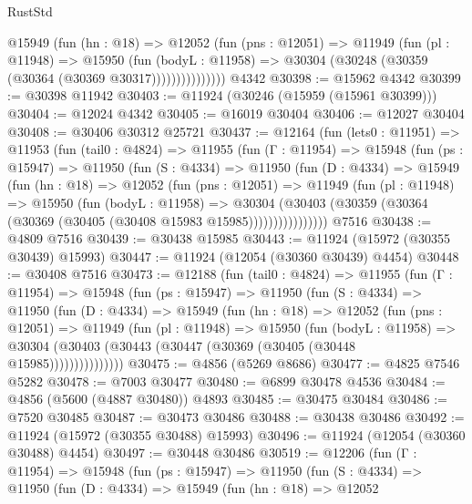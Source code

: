 \begin{lexlean}{RustStd}
\begin{coremodule}
{\begin{coremodule}
{{{{{{{{{{{{{{{{{{{{{{{{{{{{{{{{{{{{{{{{{{{{{{{{{{{{{{{{{{{{{{{{{{{{{{{{{{{{{{{{                @15949
                  (fun (hn : @18) =>
                  @12052
                    (fun (pns : @12051) =>
                    @11949
                      (fun (pl : @11948) =>
                      @15950
                        (fun (bodyL : @11958) =>
                        @30304 (@30248 (@30359 (@30364 (@30369 @30317)))))))))))))))
    @4342
@30398 := @15962 @4342
@30399 := @30398 @11942
@30403 := @11924 (@30246 (@15959 (@15961 @30399)))
@30404 := @12024 @4342
@30405 := @16019 @30404
@30406 := @12027 @30404
@30408 := @30406 @30312 @25721
@30437 := @12164
    (fun (lets0 : @11951) =>
    @11953
      (fun (tail0 : @4824) =>
      @11955
        (fun (Γ : @11954) =>
        @15948
          (fun (ps : @15947) =>
          @11950
            (fun (S : @4334) =>
            @11950
              (fun (D : @4334) =>
              @15949
                (fun (hn : @18) =>
                @12052
                  (fun (pns : @12051) =>
                  @11949
                    (fun (pl : @11948) =>
                    @15950
                      (fun (bodyL : @11958) =>
                      @30304
                        (@30403
                          (@30359 (@30364 (@30369 (@30405 (@30408 @15983 @15985))))))))))))))))
    @7516
@30438 := @4809 @7516
@30439 := @30438 @15985
@30443 := @11924 (@15972 (@30355 @30439) @15993)
@30447 := @11924 (@12054 (@30360 @30439) @4454)
@30448 := @30408 @7516
@30473 := @12188
    (fun (tail0 : @4824) =>
    @11955
      (fun (Γ : @11954) =>
      @15948
        (fun (ps : @15947) =>
        @11950
          (fun (S : @4334) =>
          @11950
            (fun (D : @4334) =>
            @15949
              (fun (hn : @18) =>
              @12052
                (fun (pns : @12051) =>
                @11949
                  (fun (pl : @11948) =>
                  @15950
                    (fun (bodyL : @11958) =>
                    @30304 (@30403 (@30443 (@30447 (@30369 (@30405 (@30448 @15985)))))))))))))))
@30475 := @4856 (@5269 @8686)
@30477 := @4825 @7546 @5282
@30478 := @7003 @30477
@30480 := @6899 @30478 @4536
@30484 := @4856 (@5600 (@4887 @30480)) @4893
@30485 := @30475 @30484
@30486 := @7520 @30485
@30487 := @30473 @30486
@30488 := @30438 @30486
@30492 := @11924 (@15972 (@30355 @30488) @15993)
@30496 := @11924 (@12054 (@30360 @30488) @4454)
@30497 := @30448 @30486
@30519 := @12206
    (fun (Γ : @11954) =>
    @15948
      (fun (ps : @15947) =>
      @11950
        (fun (S : @4334) =>
        @11950
          (fun (D : @4334) =>
          @15949
            (fun (hn : @18) =>
            @12052
}}}}}}}}}}}}}}}}}}}}}}}}}}}}}}}}}}}}}}}}}}}}}}}}}}}}}}}}}}}}}}}}}}}}}}}}}}}}}}}}
\end{coremodule}}
\end{coremodule}
\end{lexlean}
